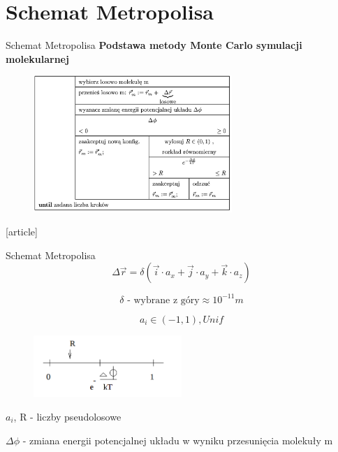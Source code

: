 \section{Schemat Metropolisa}

	\begin{frame}{Schemat Metropolisa}
		\textbf{Podstawa metody Monte Carlo symulacji molekularnej}
		\begin{figure}
			\includegraphics[width=0.67\textwidth]{img/18/metropolis1}
		\end{figure}
		\begin{thebibliography}{9}
		\end{thebibliography}
	\end{frame}


	\begin{frame}{Schemat Metropolisa}
		$$
			\Delta \vec{r} = \delta(\vec{i} \cdot a_x + \vec{j} \cdot a_y  + \vec{k} \cdot a_z)
		$$		
		
		$$
		\delta \text{ - wybrane z góry} \approx 10^{-11}m
		$$		
		
		$$
		a_i \in (-1, 1), Unif
		$$
		
		\begin{figure}
			\includegraphics[width=0.5\textwidth]{img/18/metropolis2}
		\end{figure}
		$a_i$, R - liczby pseudolosowe
		
		$\Delta\phi$ - zmiana energii potencjalnej układu w wyniku przesunięcia molekuły m
		
	\end{frame}

